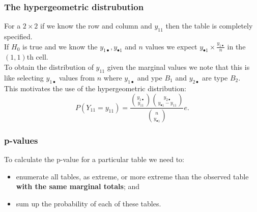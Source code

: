 \documentclass[a4paper]{article}
\begin{document}
\subsubsection{The hypergeometric distrubution}
For a \( 2 \times 2 \) if we know the row and column and \( y_{11} \) then the table is completely specified.\\
If \( H_0 \) is true and we know the \( y_{1\bullet}, y_{\bullet1} \) and \( n \) values we expect \( y_{\bullet1} \times \frac{y_{1\bullet}}{n} \) in the \( (1,1) \)th cell.\\
To obtain the distribution of \( y_{11} \) given the marginal values we note that this is like selecting \( y_{1\bullet} \) values from \( n \) where \( y_{1\bullet} \) and ype \( B_1 \) and \( y_{2\bullet} \) are type \( B_2 \).\\
This motivates the use of the hypergeometric distribution:
\[
	P(Y_{11} = y_{11}) = \frac{\binom{y_{1 \bullet}}{y_{11}}\binom{y_{2 \bullet}}{y_{\bullet 1} - y_{11}}}{\binom{n}{y_{\bullet 1}}}e.
\]
\subsubsection{p-values}
To calculate the p-value for a particular table we need to:
\begin{itemize}
	\item enumerate all tables, as extreme, or more extreme than the observed table \textbf{with the same marginal totals}; and
	\item sum up the probability of each of these tables.
\end{itemize}
\end{document}
